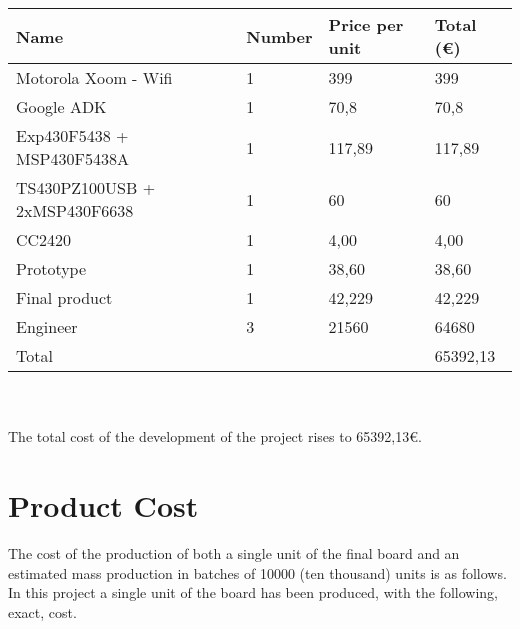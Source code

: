\begin{tabular}{| p{5cm} |l | l | l |} 
\hline
   Name & Number& Price per unit & Total ({\small \euro})\\ \hline
   Motorola Xoom - Wifi & 1 & 399 & 399\\ \hline
   Google ADK & 1 & 70,8 & 70,8\\ \hline
   Exp430F5438 + MSP430F5438A & 1 & 117,89 & 117,89\\ \hline
   TS430PZ100USB + 2xMSP430F6638 & 1 & 60 & 60\\ \hline
   CC2420 & 1 & 4,00 & 4,00\\ \hline
   Prototype & 1 & 38,60 & 38,60\\ \hline
   Final product & 1 & 42,229 & 42,229\\ \hline
   Engineer & 3 & 21560 & 64680\\ \hline
   Total & & & 65392,13\\ \hline
\end{tabular}\\\\

	The total cost of the development of the project rises to 65392,13{\small \euro}. 

\chapter{Product Cost}
\label{ch:cost}

	The cost of the production of both a single unit of the final board and an estimated mass production in batches of 10000 (ten thousand) units is as follows.\\

	In this project a single unit of the board has been produced, with the following, exact, cost.\\


